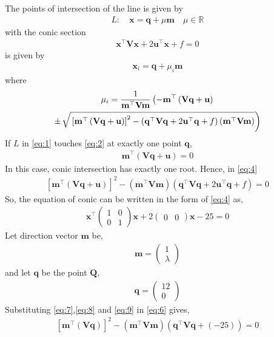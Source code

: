\documentclass[12pt]{article}
\providecommand{\sbrak}[1]{\ensuremath{{}\left[#1\right]}}
\providecommand{\brak}[1]{\ensuremath{\left(#1\right)}}
\providecommand{\lbrak}[1]{\ensuremath{\left(#1\right.}}
\providecommand{\rbrak}[1]{\ensuremath{\left.#1\right)}}
\providecommand{\brak}[1]{\ensuremath{\left(#1\right)}}
\newcommand{\myvec}[1]{\ensuremath{\begin{pmatrix}#1\end{pmatrix}}}
\let\vec\mathbf
\begin{document}
\begin{enumerate}
The points of intersection of the line is given by
\begin{align}
	L: \quad \vec{x} = \vec{q} + \mu \vec{m} \quad \mu \in \mathbb{R}\label{eq:1}
\end{align}
with the conic section
\begin{align}
	\vec{x}^{\top}\vec{V}\vec{x}+2\vec{u}^{\top}\vec{x}+f=0\label{eq:2}
\end{align}
is given by
\begin{align}
	\vec{x}_i = \vec{q} + \mu_i \vec{m}\label{eq:3}
\end{align}
where
\begin{multline}
\mu_i = \frac{1}{\vec{m}^{\top}\vec{V}\vec{m}}
	\lbrak{-\vec{m}^{\top}\brak{\vec{V}\vec{q}+\vec{u}}}\\ \pm {\small \rbrak{\sqrt{\sbrak{\vec{m}^{\top}\brak{\vec{V}\vec{q}+\vec{u}}}^2-\brak{\vec{q}^{\top}\vec{V}\vec{q} + 2\vec{u}^{\top}\vec{q} +f}\brak{\vec{m}^{\top}\vec{V}\vec{m}}}}}\label{eq:4}
\end{multline}
If $L$ in \eqref{eq:1} touches \eqref{eq:2} at exactly one point $\vec{q}$, 
\begin{align}
  \vec{m}^{\top}\brak{\vec{V}\vec{q}+\vec{u}} = 0
\end{align}
		In this case, conic intersection has exactly one root.  Hence, in \eqref{eq:4}
  \begin{align}
  \sbrak{
  \vec{m}^{\top}\brak{\vec{V}\vec{q}+\vec{u}}
  }^2 -\brak{\vec{m}^{\top}\vec{V}\vec{m}}
  \brak
  {
\vec{q}^{\top}\vec{V}\vec{q} + 2\vec{u}^{\top}\vec{q} +f
	  } = 0\label{eq:6}
  \end{align}    
		So, the equation of conic can be written in the form of \eqref{eq:4} as,
\begin{align}
	\vec{x}^{\top}\myvec{1&0\\0&1}\vec{x}+2\myvec{0&0}\vec{x}-25=0 \label{eq:7}
\end{align}
		Let direction vector $\vec{m}$ be,
\begin{align}
	\vec{m}=\myvec{1 \\ \lambda}\label{eq:8}
\end{align}
and let $\vec{q}$ be the point $\vec{Q}$,
\begin{align}
	\vec{q}=\myvec{12 \\ 0}\label{eq:9}
\end{align}
		Substituting \eqref{eq:7},\eqref{eq:8} and \eqref{eq:9} in \eqref{eq:6} gives,
\begin{align}
	\sbrak{\vec{m}^{\top}\brak{\vec{V}\vec{q}}}^2 - \brak{\vec{m}^{\top}\vec{V}\vec{m}}\brak{\vec{q}^{\top}\vec{V}\vec{q}+(-25)} =0

\end{align}
\end{enumerate}
\end{document}
